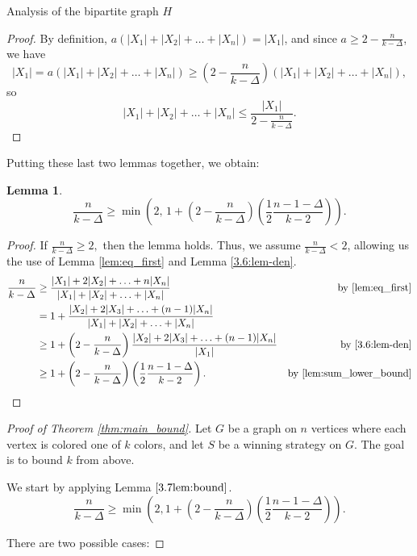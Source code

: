 \documentclass[11pt, letterpaper]{article}
\theoremstyle{plain}
\theoremstyle{plain}
\newtheorem{lemma}[theorem]{Lemma}
\newcommand{\Xsum}{|X_1|+|X_2|+\ldots+|X_n|}
\newcommand{\wXsum}{|X_1|+2|X_2|+\ldots +n|X_n|}
\begin{document}
\begin{section}{Analysis of the bipartite graph $H$}
\begin{proof}
        By definition, $a(\Xsum)=|X_1|$, and since $a\geq 2-\frac{n}{k-\Delta}$, we have $$|X_1|=a(\Xsum)\geq (2-\frac{n}{k-\Delta})(\Xsum), $$ so $$\Xsum \leq \frac{|X_1|}{2-\frac{n}{k-\Delta}}.$$
    \end{proof}

Putting these last two lemmas together, we obtain:
\vspace{3em}

\begin{lemma}\label{3.7lem:bound} %
    $$\frac n {k-\Delta} \geq \min \left(2,\, 1+\left(2-\frac{n}{k-\Delta}\right)\left(\frac{1}{2}\frac{n-1-\Delta}{k-2}\right)\right).$$
\end{lemma} 
\vspace{1em}
\begin{proof}
If $\frac n {k-\Delta} \geq 2,$ then the lemma holds. Thus, we  assume $\frac n {k-\Delta} < 2$, allowing us the use of Lemma \ref{lem:eq_first} and Lemma \ref{3.6:lem-den}.
    \begin{align*}
        \frac{n}{k-\Delta} &\geq \frac{\wXsum}{\Xsum}  & \text{by \ref{lem:eq_first}}
        \\ & = 1+\frac{|X_2|+2|X_3|+\ldots +(n-1)|X_n|}{\Xsum} 
        \\&\geq 1+ \left(2-\frac{n}{k-\Delta}\right) \frac{|X_2|+2|X_3|+\ldots+ (n-1)|X_n|}{|X_1|} &\text{by \ref{3.6:lem-den}}
        \\& \geq 1+\left(2-\frac{n}{k-\Delta}\right)\left(\frac{1}{2}\frac{n-1-\Delta}{k-2}\right). &\text{by \ref{lem:sum_lower_bound}}
    \end{align*}
\end{proof}
\newpage
\begin{proof}[Proof of Theorem \ref{thm:main_bound}]
    Let $G$ be a graph on $n$ vertices where each vertex is colored one of $k$ colors, and let $S$ be a winning strategy on $G$. The goal is to bound $k$ from above.
    
   We start by applying Lemma $\ref{3.7lem:bound}$. 
   $$\frac{n}{k-\Delta}\geq \min \left(2, 1+\left(2-\frac{n}{k-\Delta}\right)\left(\frac{1}{2}\frac{n-1-\Delta}{k-2}\right)\right).$$

   There are two possible cases:


\end{proof}
\end{section}
\end{document}
